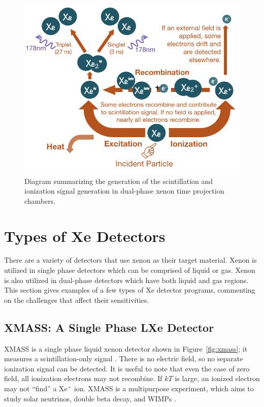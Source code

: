 \begin{figure}[htbp]
\begin{center}
\includegraphics[width=\textwidth]{figures/lxetpcs/signal_generation_in_lxe.png}
\caption{ Diagram summarizing the generation of the scintillation and ionization signal generation in dual-phase xenon time projection chambers.}
\label{fig:sig_gen}
\end{center}
\end{figure}

 
\FloatBarrier
\section{Types of Xe Detectors}
\label{sec:xe_detectors}
There are a variety of detectors that use xenon as their target material. Xenon is utilized in single phase detectors which can be comprised of liquid or gas. Xenon is also utilized in dual-phase detectors which have both liquid and gas regions. This section gives examples of a few types of Xe detector programs, commenting on the challenges that affect their sensitivities. 

\subsection{XMASS: A Single Phase LXe Detector}
XMASS is a single phase liquid xenon detector shown in Figure~\ref{fig:xmass}; it measures a scintillation-only signal \cite{Abe2013}. There is no electric field, so no separate ionization signal can be detected. It is useful to note that even the case of zero field, all ionization electrons may not recombine. If $kT$ is large, an ionized electron may not ``find'' a Xe$^{+}$ ion. XMASS is a multipurpose experiment, which aims to study solar neutrinos, double beta decay, and \ac{WIMP}s \cite{Chepel2013}.

